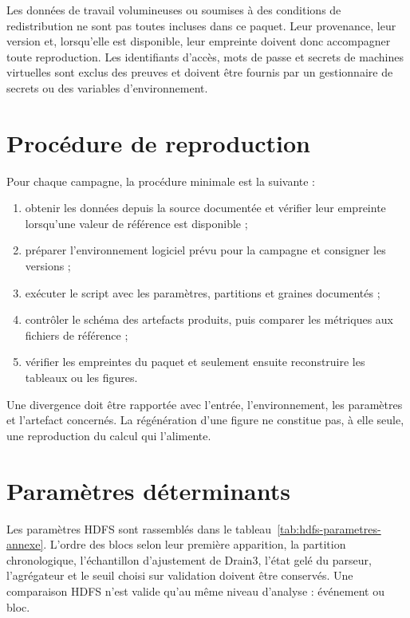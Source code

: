 Les données de travail volumineuses ou soumises à des conditions de redistribution ne
sont pas toutes incluses dans ce paquet. Leur provenance, leur version et, lorsqu'elle est
disponible, leur empreinte doivent donc accompagner toute reproduction. Les identifiants
d'accès, mots de passe et secrets de machines virtuelles sont exclus des preuves et doivent
être fournis par un gestionnaire de secrets ou des variables d'environnement.

\section{Procédure de reproduction}

Pour chaque campagne, la procédure minimale est la suivante :

\begin{enumerate}
  \item obtenir les données depuis la source documentée et vérifier leur empreinte lorsqu'une
  valeur de référence est disponible ;
  \item préparer l'environnement logiciel prévu pour la campagne et consigner les versions ;
  \item exécuter le script avec les paramètres, partitions et graines documentés ;
  \item contrôler le schéma des artefacts produits, puis comparer les métriques aux fichiers
  de référence ;
  \item vérifier les empreintes du paquet et seulement ensuite reconstruire les tableaux ou
  les figures.
\end{enumerate}

Une divergence doit être rapportée avec l'entrée, l'environnement, les paramètres et
l'artefact concernés. La régénération d'une figure ne constitue pas, à elle seule, une
reproduction du calcul qui l'alimente.

\section{Paramètres déterminants}

Les paramètres HDFS sont rassemblés dans le
tableau~\ref{tab:hdfs-parametres-annexe}. L'ordre des blocs selon leur première apparition,
la partition chronologique, l'échantillon d'ajustement de Drain3, l'état gelé du parseur,
l'agrégateur et le seuil choisi sur validation doivent être conservés. Une comparaison
HDFS n'est valide qu'au même niveau d'analyse : événement ou bloc.

